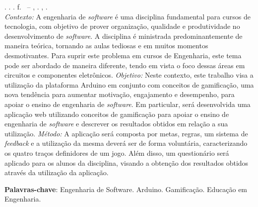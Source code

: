 
\begin{resumo}[RESUMO]
\begin{SingleSpacing}

\imprimirautorcitacao. \imprimirtitulo. \imprimirdata. \pageref {LastPage} f. \imprimirprojeto\ – \imprimirprograma, \imprimirinstituicao. \imprimirlocal, \imprimirdata.\\
\textit{Contexto:} A engenharia de \textit{software} é uma disciplina fundamental para cursos de tecnologia, com objetivo de prover organização, qualidade e produtividade no desenvolvimento de \textit{software}. A disciplina é ministrada predominantemente de maneira teórica, tornando as aulas tediosas e em muitos momentos desmotivantes. Para suprir este problema em cursos de Engenharia, este tema pode ser abordado de maneira diferente, tendo em vista o foco dessas áreas em circuitos e componentes eletrônicos. \textit{Objetivo:} Neste contexto, este trabalho visa a utilização da plataforma Arduino em conjunto com conceitos de gamificação, uma nova tendência para aumentar motivação, engajamento e desempenho, para apoiar o ensino de engenharia de \textit{software}. Em particular, será desenvolvida uma aplicação web utilizando conceitos de gamificação para apoiar o ensino de engenharia de \textit{software} e descrever os resultados obtidos em relação a sua utilização. \textit{Método:} A aplicação será composta por metas, regras, um sistema de \textit{feedback} e a utilização da mesma deverá ser de forma voluntária, caracterizando os quatro traços definidores de um jogo. Além disso, um questionário será aplicado para os alunos da disciplina, visando a obtenção dos resultados obtidos através da utilização da aplicação. 

\textbf{Palavras-chave}: Engenharia de Software. Arduino. Gamificação. Educação em Engenharia.

\end{SingleSpacing}
\end{resumo}

